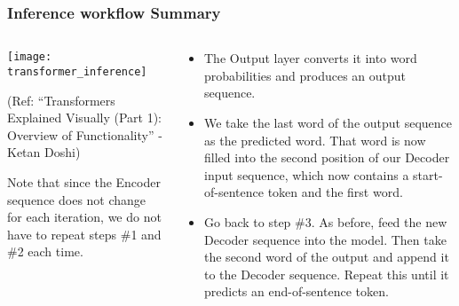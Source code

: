 \begin{frame}[fragile]\frametitle{Inference workflow Summary}

\begin{columns}
     \begin{column}[T]{0.5\linewidth}
\begin{center}
\texttt{[image: transformer\_inference]}


{\tiny (Ref: ``Transformers Explained Visually (Part 1): Overview of Functionality'' - Ketan Doshi)}
\end{center}		

Note that since the Encoder sequence does not change for each iteration, we do not have to repeat steps \#1 and \#2 each time.
		\end{column}
    \begin{column}[T]{0.5\linewidth}

\begin{itemize}
\item The Output layer converts it into word probabilities and produces an output sequence.
\item We take the last word of the output sequence as the predicted word. That word is now filled into the second position of our Decoder input sequence, which now contains a start-of-sentence token and the first word.
\item Go back to step \#3. As before, feed the new Decoder sequence into the model. Then take the second word of the output and append it to the Decoder sequence. Repeat this until it predicts an end-of-sentence token. 

\end{itemize}
    \end{column}
  \end{columns}	

\end{frame}



